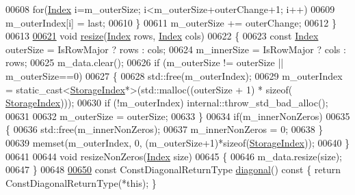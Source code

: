 \begin{DoxyCode}
00608         \textcolor{keywordflow}{for}(\hyperlink{group___core___module_a554f30542cc2316add4b1ea0a492ff02}{Index} i=m\_outerSize; i<m\_outerSize+outerChange+1; i++)          
00609           m\_outerIndex[i] = last; 
00610       \}
00611       m\_outerSize += outerChange;
00612     \}
00613     
\hyperlink{group___sparse_core___module_af88551f30202341b7cc24cfadabdec5c}{00621}     \textcolor{keywordtype}{void} \hyperlink{group___sparse_core___module_af88551f30202341b7cc24cfadabdec5c}{resize}(\hyperlink{group___core___module_a554f30542cc2316add4b1ea0a492ff02}{Index} rows, \hyperlink{group___core___module_a554f30542cc2316add4b1ea0a492ff02}{Index} cols)
00622     \{
00623       \textcolor{keyword}{const} \hyperlink{group___core___module_a554f30542cc2316add4b1ea0a492ff02}{Index} outerSize = IsRowMajor ? rows : cols;
00624       m\_innerSize = IsRowMajor ? cols : rows;
00625       m\_data.clear();
00626       \textcolor{keywordflow}{if} (m\_outerSize != outerSize || m\_outerSize==0)
00627       \{
00628         std::free(m\_outerIndex);
00629         m\_outerIndex = \textcolor{keyword}{static\_cast<}\hyperlink{group___sparse_core___module_a0b540ba724726ebe953f8c0df06081ed}{StorageIndex}*\textcolor{keyword}{>}(std::malloc((outerSize + 1) * \textcolor{keyword}{sizeof}(
      \hyperlink{group___sparse_core___module_a0b540ba724726ebe953f8c0df06081ed}{StorageIndex})));
00630         \textcolor{keywordflow}{if} (!m\_outerIndex) internal::throw\_std\_bad\_alloc();
00631         
00632         m\_outerSize = outerSize;
00633       \}
00634       \textcolor{keywordflow}{if}(m\_innerNonZeros)
00635       \{
00636         std::free(m\_innerNonZeros);
00637         m\_innerNonZeros = 0;
00638       \}
00639       memset(m\_outerIndex, 0, (m\_outerSize+1)*\textcolor{keyword}{sizeof}(\hyperlink{group___sparse_core___module_a0b540ba724726ebe953f8c0df06081ed}{StorageIndex}));
00640     \}
00641 
00644     \textcolor{keywordtype}{void} resizeNonZeros(\hyperlink{group___core___module_a554f30542cc2316add4b1ea0a492ff02}{Index} size)
00645     \{
00646       m\_data.resize(size);
00647     \}
00648 
\hyperlink{group___sparse_core___module_a4423486f9fd64cbac7be06c748b37e0a}{00650}     \textcolor{keyword}{const} ConstDiagonalReturnType \hyperlink{group___sparse_core___module_a4423486f9fd64cbac7be06c748b37e0a}{diagonal}()\textcolor{keyword}{ const }\{ \textcolor{keywordflow}{return} ConstDiagonalReturnType(*\textcolor{keyword}{this}); \}

\end{DoxyCode}
